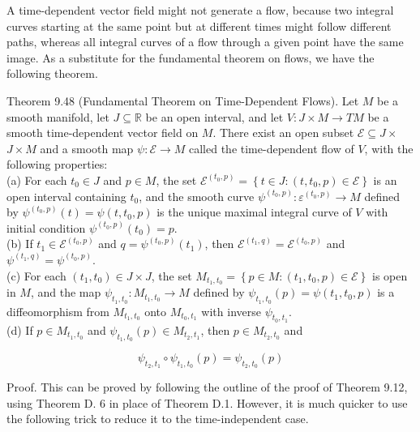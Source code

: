 \documentclass[10pt]{article}
\begin{document}
A time-dependent vector field might not generate a flow, because two integral curves starting at the same point but at different times might follow different paths, whereas all integral curves of a flow through a given point have the same image. As a substitute for the fundamental theorem on flows, we have the following theorem.

Theorem 9.48 (Fundamental Theorem on Time-Dependent Flows). Let $M$ be a smooth manifold, let $J \subseteq \mathbb{R}$ be an open interval, and let $V: J \times M \rightarrow T M$ be a smooth time-dependent vector field on $M$. There exist an open subset $\mathcal{E} \subseteq J \times$ $J \times M$ and a smooth map $\psi: \mathcal{E} \rightarrow M$ called the time-dependent flow of $V$, with the following properties:\\
(a) For each $t_{0} \in J$ and $p \in M$, the set $\mathscr{E}^{\left(t_{0}, p\right)}=\left\{t \in J:\left(t, t_{0}, p\right) \in \mathscr{E}\right\}$ is an open interval containing $t_{0}$, and the smooth curve $\psi^{\left(t_{0}, p\right)}: \varepsilon^{\left(t_{0}, p\right)} \rightarrow M$ defined by $\psi^{\left(t_{0}, p\right)}(t)=\psi\left(t, t_{0}, p\right)$ is the unique maximal integral curve of $V$ with initial condition $\psi^{\left(t_{0}, p\right)}\left(t_{0}\right)=p$.\\
(b) If $t_{1} \in \mathcal{E}^{\left(t_{0}, p\right)}$ and $q=\psi^{\left(t_{0}, p\right)}\left(t_{1}\right)$, then $\mathcal{E}^{\left(t_{1}, q\right)}=\mathcal{E}^{\left(t_{0}, p\right)}$ and $\psi^{\left(t_{1}, q\right)}=\psi^{\left(t_{0}, p\right)}$.\\
(c) For each $\left(t_{1}, t_{0}\right) \in J \times J$, the set $M_{t_{1}, t_{0}}=\left\{p \in M:\left(t_{1}, t_{0}, p\right) \in \mathcal{E}\right\}$ is open in $M$, and the map $\psi_{t_{1}, t_{0}}: M_{t_{1}, t_{0}} \rightarrow M$ defined by $\psi_{t_{1}, t_{0}}(p)=\psi\left(t_{1}, t_{0}, p\right)$ is a diffeomorphism from $M_{t_{1}, t_{0}}$ onto $M_{t_{0}, t_{1}}$ with inverse $\psi_{t_{0}, t_{1}}$.\\
(d) If $p \in M_{t_{1}, t_{0}}$ and $\psi_{t_{1}, t_{0}}(p) \in M_{t_{2}, t_{1}}$, then $p \in M_{t_{2}, t_{0}}$ and

$$
\psi_{t_{2}, t_{1}} \circ \psi_{t_{1}, t_{0}}(p)=\psi_{t_{2}, t_{0}}(p)
$$

Proof. This can be proved by following the outline of the proof of Theorem 9.12, using Theorem D. 6 in place of Theorem D.1. However, it is much quicker to use the following trick to reduce it to the time-independent case.
\end{document}
